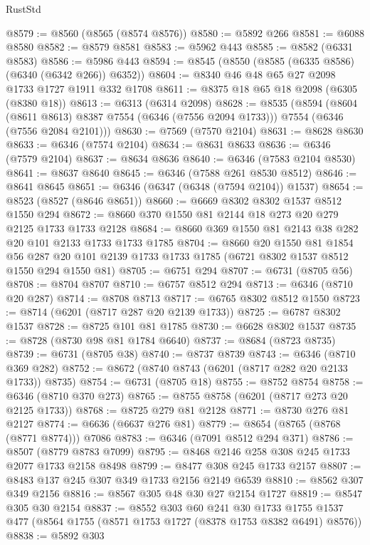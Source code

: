 \begin{lexlean}{RustStd}
\begin{coremodule}
@8579 := @8560 (@8565 (@8574 @8576))
@8580 := @5892 @266
@8581 := @6088 @8580
@8582 := @8579 @8581
@8583 := @5962 @443
@8585 := @8582 (@6331 @8583)
@8586 := @5986 @443
@8594 := @8545 (@8550 (@8585 (@6335 @8586) (@6340 (@6342 @266)) @6352))
@8604 := @8340 @46 @48 @65 @27 @2098 @1733 @1727 @1911 @332 @1708
@8611 := @8375 @18 @65 @18 @2098 (@6305 (@8380 @18))
@8613 := @6313 (@6314 @2098)
@8628 := @8535
    (@8594
      (@8604 (@8611 @8613) @8387 @7554 (@6346 (@7556 @2094 @1733)))
      @7554
      (@6346 (@7556 @2084 @2101)))
@8630 := @7569 (@7570 @2104)
@8631 := @8628 @8630
@8633 := @6346 (@7574 @2104)
@8634 := @8631 @8633
@8636 := @6346 (@7579 @2104)
@8637 := @8634 @8636
@8640 := @6346 (@7583 @2104 @8530)
@8641 := @8637 @8640
@8645 := @6346 (@7588 @261 @8530 @8512)
@8646 := @8641 @8645
@8651 := @6346 (@6347 (@6348 (@7594 @2104)) @1537)
@8654 := @8523 (@8527 (@8646 @8651))
@8660 := @6669 @8302 @8302 @1537 @8512 @1550 @294
@8672 := @8660 @370 @1550 @81 @2144 @18 @273 @20 @279 @2125 @1733 @1733 @2128
@8684 := @8660 @369 @1550 @81 @2143 @38 @282 @20 @101 @2133 @1733 @1733 @1785
@8704 := @8660
    @20
    @1550
    @81
    @1854
    @56
    @287
    @20
    @101
    @2139
    @1733
    @1733
    @1785
    (@6721 @8302 @1537 @8512 @1550 @294 @1550 @81)
@8705 := @6751 @294
@8707 := @6731 (@8705 @56)
@8708 := @8704 @8707
@8710 := @6757 @8512 @294
@8713 := @6346 (@8710 @20 @287)
@8714 := @8708 @8713
@8717 := @6765 @8302 @8512 @1550
@8723 := @8714 (@6201 (@8717 @287 @20 @2139 @1733))
@8725 := @6787 @8302 @1537
@8728 := @8725 @101 @81 @1785
@8730 := @6628 @8302 @1537
@8735 := @8728 (@8730 @98 @81 @1784 @6640)
@8737 := @8684 (@8723 @8735)
@8739 := @6731 (@8705 @38)
@8740 := @8737 @8739
@8743 := @6346 (@8710 @369 @282)
@8752 := @8672 (@8740 @8743 (@6201 (@8717 @282 @20 @2133 @1733)) @8735)
@8754 := @6731 (@8705 @18)
@8755 := @8752 @8754
@8758 := @6346 (@8710 @370 @273)
@8765 := @8755 @8758 (@6201 (@8717 @273 @20 @2125 @1733))
@8768 := @8725 @279 @81 @2128
@8771 := @8730 @276 @81 @2127
@8774 := @6636 (@6637 @276 @81)
@8779 := @8654 (@8765 (@8768 (@8771 @8774))) @7086
@8783 := @6346 (@7091 @8512 @294 @371)
@8786 := @8507 (@8779 @8783 @7099)
@8795 := @8468 @2146 @258 @308 @245 @1733 @2077 @1733 @2158 @8498
@8799 := @8477 @308 @245 @1733 @2157
@8807 := @8483 @137 @245 @307 @349 @1733 @2156 @2149 @6539
@8810 := @8562 @307 @349 @2156
@8816 := @8567 @305 @48 @30 @27 @2154 @1727
@8819 := @8547 @305 @30 @2154
@8837 := @8552
    @303
    @60
    @241
    @30
    @1733
    @1755
    @1537
    @477
    (@8564 @1755 (@8571 @1753 @1727 (@8378 @1753 @8382 @6491) @8576))
@8838 := @5892 @303

\end{coremodule}
\end{lexlean}
